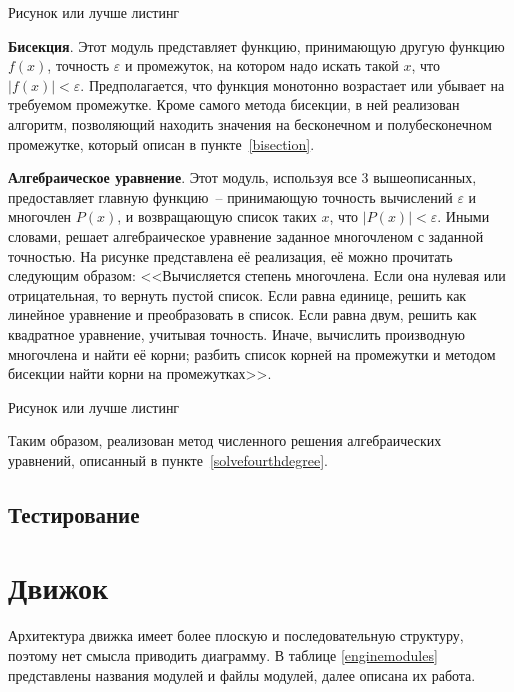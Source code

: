 \TODO Рисунок или лучше листинг

\textbf{Бисекция}. Этот модуль представляет функцию, принимающую другую функцию \(f(x)\), точность \(\varepsilon\)
и промежуток, на котором надо искать такой \(x\), что \(\left|f(x)\right| < \varepsilon\). Предполагается, что
функция монотонно возрастает или убывает на требуемом промежутке. Кроме самого метода бисекции, в ней реализован алгоритм,
позволяющий находить значения на бесконечном и полубесконечном промежутке, который описан в пункте~\ref{bisection}.

\textbf{Алгебраическое уравнение}. Этот модуль, используя все 3 вышеописанных, предоставляет главную функцию~-- принимающую
точность вычислений \(\varepsilon\) и многочлен \(P(x)\), и возвращающую список таких \(x\), что \(\left|P(x)\right| < \varepsilon\).
Иными словами, решает алгебраическое уравнение заданное многочленом с заданной точностью. На рисунке \TODO представлена её реализация, её можно прочитать следующим образом:
<<Вычисляется степень многочлена.
Если она нулевая или отрицательная, то вернуть пустой список.
Если равна единице, решить как линейное уравнение и преобразовать в список.
Если равна двум, решить как квадратное уравнение, учитывая точность.
Иначе, вычислить производную многочлена и найти её корни; разбить список корней на промежутки и методом бисекции найти корни на промежутках>>.

\TODO Рисунок или лучше листинг

Таким образом, реализован метод численного решения алгебраических уравнений, описанный в пункте~\ref{solvefourthdegree}.

\subsection{Тестирование}

\TODO

\section{Движок}\label{engine}

Архитектура движка имеет более плоскую и последовательную структуру, поэтому нет смысла приводить диаграмму.
В таблице \ref{enginemodules} представлены названия модулей и файлы модулей, далее описана их работа.

